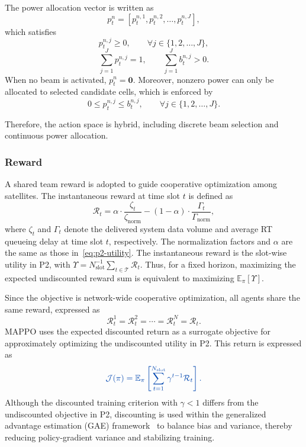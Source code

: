 \documentclass[journal]{IEEEtran}
\newcommand{\revbegin}[1]{\color{revisionblue}\ignorespaces}
\newcommand{\revend}[1]{\color{black}\ignorespaces}
\begin{document}
The power allocation vector is written as
\begin{equation}
p_t^n=[p_t^{n,1},p_t^{n,2},\ldots,p_t^{n,J}],
\end{equation}
which satisfies
\begin{equation}
p_t^{n,j}\ge0,\qquad \forall j\in\{1,2,\ldots,J\},
\end{equation}
\begin{equation}
\sum_{j=1}^{J} p_t^{n,j}=1,\qquad \sum_{j=1}^{J}b_t^{n,j}>0.
\end{equation}
When no beam is activated, $p_t^n=\mathbf 0$. Moreover, nonzero power can only be allocated to selected candidate cells, which is enforced by
\begin{equation}
0\le p_t^{n,j}\le b_t^{n,j},\qquad \forall j\in\{1,2,\ldots,J\}.
\end{equation}

Therefore, the action space is hybrid, including discrete beam selection and continuous power allocation.

\subsubsection{Reward}

A shared team reward is adopted to guide cooperative optimization among satellites. The instantaneous reward at time slot $t$ is defined as
\begin{equation}
\mathcal{R}_t=\alpha\cdot\frac{\zeta_t}{\zeta_{\mathrm{norm}}}-(1-\alpha)\cdot\frac{\Gamma_t}{\Gamma_{\mathrm{norm}}},
\label{eq:team-reward}
\end{equation}
\revbegin{}where $\zeta_t$ and $\Gamma_t$ denote the delivered system data volume and average RT queueing delay at time slot $t$, respectively. The normalization factors and $\alpha$ are the same as those in~\eqref{eq:p2-utility}. The instantaneous reward is the slot-wise utility in P2, with $\Upsilon=N_{\mathrm{slot}}^{-1}\sum_{t\in\mathcal T}\mathcal R_t$. Thus, for a fixed horizon, maximizing the expected undiscounted reward sum is equivalent to maximizing $\mathbb E_\pi[\Upsilon]$.\revend{}

Since the objective is network-wide cooperative optimization, all agents share the same reward, expressed as
\begin{equation}
\mathcal{R}_t^1=\mathcal{R}_t^2=\cdots=\mathcal{R}_t^N=\mathcal{R}_t.
\end{equation}
\revbegin{}MAPPO uses the expected discounted return as a surrogate objective for approximately optimizing the undiscounted utility in P2. This return is expressed as\revend{}
\begin{equation}\color{revisionblue}
\mathcal{J}(\pi)=\mathbb{E}_{\pi}\left[\sum_{t=1}^{N_{\mathrm{slot}}}\gamma^{t-1}\mathcal{R}_t\right].
\label{eq:discounted-surrogate}
\end{equation}
\revbegin{}Although the discounted training criterion with $\gamma<1$ differs from the undiscounted objective in P2, discounting is used within the generalized advantage estimation (GAE) framework~\cite{refGAE} to balance bias and variance, thereby reducing policy-gradient variance and stabilizing training.\revend{}
\end{document}
